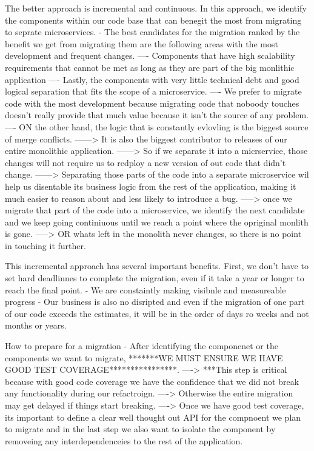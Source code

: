 \documentclass[a4paper, 11pt]{book}
\begin{document}
{    The better approach is incremental and continuous.
    In this approach, we identify the components within our code base that can benegit the most from migrating to seprate microservices.
    - The best candidates for the migration ranked by the benefit we get from migrating them are the following areas with the most development and frequent changes.
    ---- Components that have high scalability requirements that cannot be met as long as they are part of the big monlithic application
    ---- Lastly, the components with very little technical debt and good logical separation that fits the scope of a microservice.
    ---- We prefer to migrate code with the most development because migrating code that noboody touches doesn't really provide that much value because it isn't the source of any problem.
    ---- ON the other hand, the logic that is constantly evlovling is the biggest source of merge conflicts.
    ------> It is also the biggest contributor to releases of our entire monolithic application.
    ------> So if we separate it into a micrservice, those changes will not require us to redploy a new version of out code that didn't change.
    ------> Separating those parts of the code into a separate microservice wil help us disentable its business logic from the rest of the application, making it much easier to reason about and less likely to introduce a bug.
    -----> once we migrate that part of the code into a microservice, we identify the next candidate and we keep going continiuous until we reach a point where the opriginal monlith is gone.
    -----> OR whats left in the monolith never changes, so there is no point in touching it further.

    This incremental approach has several important benefits.
    First, we don't have to set hard deadlinnes to complete the migration, even if it take a year or longer to reach the final point.
    - We are constaintly making visibnle and measureable progress
    - Our business is also no disripted and even if the migration of one part of our code exceeds the estimates, it will be in the order of days ro weeks and not months or years.

    How to prepare for a migration
    - After identifying the componenet or the components we want to migrate, *******WE MUST ENSURE WE HAVE GOOD TEST COVERAGE****************.
    ----> ***This step is critical because with good code coverage we have the confidence that we did not break any functionality during our refactroign.
    ----> Otherwise the entire migration may get delayed if things start breaking.
    ----> Once we have good test coverage, its important to define a clear well thought out API for the compnoent we plan to migrate and in the last step we also want to isolate the component by removeing any interdependenceies to the rest of the application.

}
\end{document}
